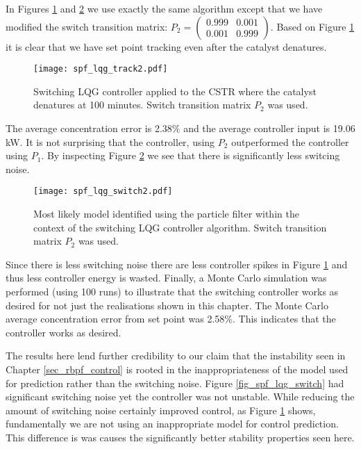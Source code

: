 In Figures \ref{fig_spf_lqg_track2} and \ref{fig_spf_lqg_switch2} we use exactly the same algorithm except that we have modified the switch transition matrix: $P_2=\begin{pmatrix}
0.999 & 0.001 \\ 0.001 & 0.999
\end{pmatrix}$. Based on Figure \ref{fig_spf_lqg_track2} it is clear that we have set point tracking even after the catalyst denatures.
\begin{figure}[H] 
\centering
\texttt{[image: spf\_lqg\_track2.pdf]}
\caption{Switching LQG controller applied to the CSTR where the catalyst denatures at 100 minutes. Switch transition matrix $P_2$ was used.}
\label{fig_spf_lqg_track2}
\end{figure}
The average concentration error is 2.38\% and the average controller input is 19.06 kW. It is not surprising that the controller, using $P_2$ outperformed the controller using $P_1$. By inspecting Figure \ref{fig_spf_lqg_switch2} we see that there is significantly less switcing noise.  
\begin{figure}[H] 
\centering
\texttt{[image: spf\_lqg\_switch2.pdf]}
\caption{Most likely model identified using the particle filter within the context of the switching LQG controller algorithm. Switch transition matrix $P_2$ was used.}
\label{fig_spf_lqg_switch2}
\end{figure}
Since there is less switching noise there are less controller spikes in Figure \ref{fig_spf_lqg_track2} and thus less controller energy is wasted.    Finally, a Monte Carlo simulation was performed (using 100 runs) to illustrate that the switching controller works as desired for not just the realisations shown in this chapter. The Monte Carlo average concentration error from set point was 2.58\%. This indicates that the controller works as desired.

The results here lend further credibility to our claim that the instability seen in Chapter \ref{sec_rbpf_control} is rooted in the inappropriateness of the model used for prediction rather than the switching noise. Figure \ref{fig_spf_lqg_switch} had significant switching noise yet the controller was not unstable. While reducing the amount of switching noise certainly improved control, as Figure \ref{fig_spf_lqg_track2} shows, fundamentally we are not using an inappropriate model for control prediction. This difference is was causes the significantly better stability properties seen here.

